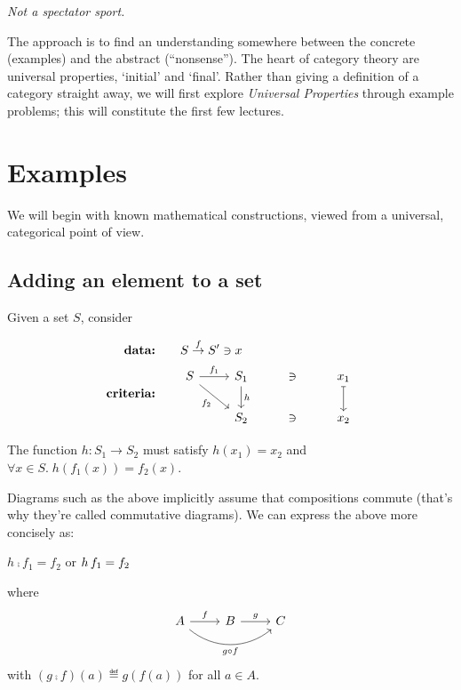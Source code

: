 \emph{Not a spectator sport.}

The approach is to find an understanding somewhere between the concrete
(examples) and the abstract (``nonsense''). The heart of category theory are
universal properties, `initial' and `final'. 
Rather than giving a definition of a category straight away, we will first
explore \emph{Universal Properties} through example problems; this will
constitute the first few lectures.

\section{Examples}
We will begin with known mathematical constructions, viewed from a universal,
categorical point of view.

\subsection{Adding an element to a set}
\label{add-element-set}

Given a set $S$, consider

\begin{align*}
    \textbf{data:}&\qquad S \overset{f}{\rightarrow} S^\prime \ni x \\
    \textbf{criteria:}& \qquad 
    \begin{tikzcd}[ampersand replacement=\&]
        S \arrow[r, "f_1"]
          \arrow[dr, swap, "f_2"]
          \&
        S_1 \arrow[d, "h"] \& \ni \& x_1 \arrow[d, mapsto]
          \\
          {}\&
        S_2 \& \ni \& x_2
    \end{tikzcd}
\end{align*}

The function $h : S_1 \rightarrow S_2$ must satisfy $h(x_1) = x_2$ and 
$\forall x \in S .\; h(f_1(x)) = f_2(x)$.

\begin{framed}
Diagrams such as the above implicitly assume that compositions commute (that's
why they're called commutative diagrams). We can express the above more
concisely as:
\begin{center}
$h\comp f_1 = f_2$
\quad or \quad
$h\, f_1 = f_2$
\end{center}
where 
$$
\begin{tikzcd}
    A \arrow[r, "f"] \arrow[rr, swap, bend right=40, "g \circ f"] & B \arrow[r, "g"] & C
\end{tikzcd}
$$
with $(g\comp f)(a)\eqdef g(f(a))$ for all $a\in A$.
\end{framed}

